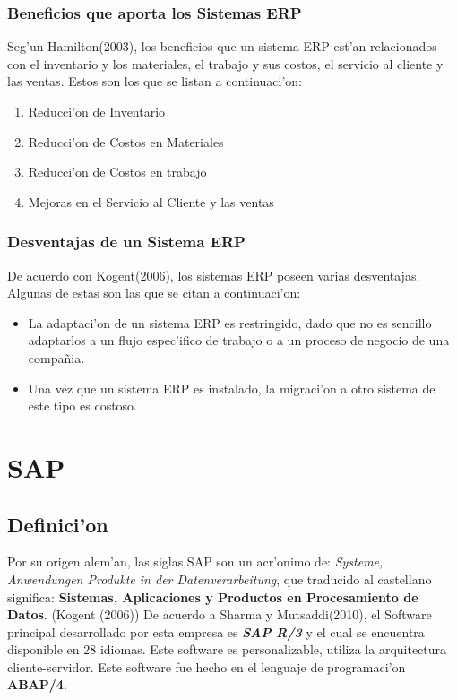 \subsubsection{Beneficios que aporta los Sistemas ERP}
	Seg'un Hamilton(2003), los beneficios que un sistema ERP est'an relacionados con el inventario y los materiales, el trabajo y sus costos, el servicio al cliente y las ventas. Estos son los que se listan a continuaci'on:
\begin{enumerate}
\item Reducci'on de Inventario
\item Reducci'on de Costos en Materiales
\item Reducci'on de Costos en trabajo
\item Mejoras en el Servicio al Cliente y las ventas
\end{enumerate}
\subsubsection{Desventajas de un Sistema ERP}
\indent De acuerdo con Kogent(2006), los sistemas ERP poseen varias desventajas. Algunas de estas son las que se citan a continuaci'on:
\begin{itemize}
\item La adaptaci'on de un sistema ERP es restringido, dado que no es sencillo adaptarlos a un flujo espec'ifico de trabajo o a un proceso de negocio de una compa\~nia.
\item Una vez que un sistema ERP es instalado, la migraci'on a otro sistema de este tipo es costoso.
\end{itemize}
\section{SAP} \label{sect:sap}


\subsection{Definici'on} \label{subsect:defprop}
	 Por su origen alem'an, las siglas SAP son un acr'onimo de: \textit{Systeme, Anwendungen Produkte in der Datenverarbeitung}, que traducido al castellano significa: \textbf{Sistemas, Aplicaciones y Productos en Procesamiento de Datos}. (Kogent (2006))
\newline
\newline
\indent De acuerdo a Sharma y Mutsaddi(2010), el Software principal desarrollado por esta empresa es \textbf{\textit{SAP R/3}} y el cual se encuentra disponible en 28 idiomas. Este software es personalizable, utiliza la arquitectura cliente-servidor. Este software fue hecho en el lenguaje de programaci'on \textbf{ABAP/4}. 

